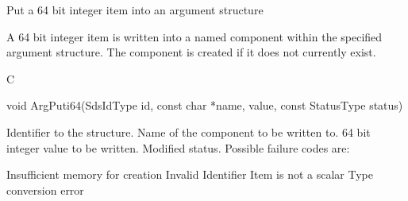 \begin{manroutinedescription}
      Put a 64 bit integer item into an argument structure

      A 64 bit integer item is written into a named component within the
      specified argument structure. The component is created if it
      does not currently exist.
 
      C

      void ArgPuti64(SdsIdType id, const char *name, {} value, %
const StatusType {\mantt{*}} status)
 
\begin{manparametertable}
 Identifier to the structure.
 Name of the component to be %
written to.
 64 bit integer value %
to be written.
 Modified status. Possible %
failure codes are:
\end{manparametertable}
\begin{mantwocolumntable}
Insufficient memory for creation
Invalid Identifier
Item is not a scalar
Type conversion error
\end{mantwocolumntable}
\end{manroutinedescription}
